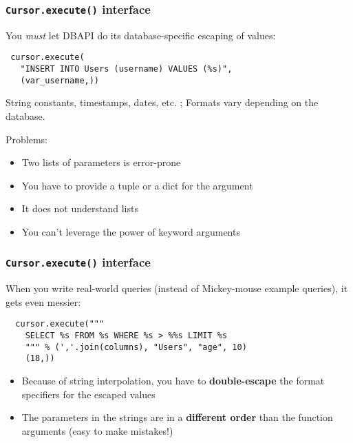 \documentclass{beamer}
\begin{document}
\begin{frame}[fragile]
  \frametitle{\texttt{Cursor.execute()} interface}

  You \emph{must} let DBAPI do its database-specific escaping of values:
\begin{verbatim}
 cursor.execute(
   "INSERT INTO Users (username) VALUES (%s)",
   (var_username,))
\end{verbatim}

String constants, timestamps, dates, etc. ; Formats vary depending on the
database.

\pause
\vfill
Problems:
\begin{itemize}
\item Two lists of parameters is error-prone
\item You have to provide a tuple or a dict for the argument
\item It does not understand lists 
\item You can't leverage the power of keyword arguments
\end{itemize}

\end{frame}


\begin{frame}[fragile]
  \frametitle{\texttt{Cursor.execute()} interface}

  When you write real-world queries (instead of Mickey-mouse example
  queries), it gets even messier:
\begin{verbatim}
  cursor.execute("""
    SELECT %s FROM %s WHERE %s > %%s LIMIT %s
    """ % (','.join(columns), "Users", "age", 10)
    (18,))
\end{verbatim}

\begin{itemize}
\item Because of string interpolation, you have to \textbf{double-escape} the
  format specifiers for the escaped values
\item The parameters in the strings are in a \textbf{different order} than the
  function arguments (easy to make mistakes!)
\end{itemize}

\end{frame}
\end{document}
